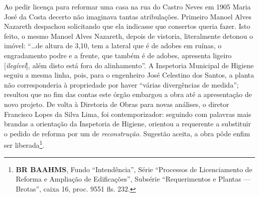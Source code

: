 Ao pedir licença para reformar uma casa na rua do Castro Neves em 1905 Maria José da Costa decerto não imaginava tantas atribulações. Primeiro Manoel Alves Nazareth despachou solicitando que ela indicasse que consertos queria fazer. Isto feito, o mesmo Manoel Alves Nazareth, depois de vistoria, literalmente detonou o imóvel: ``\dots de altura de 3,10, tem a lateral que é de adobes em ruínas, o engradamento podre e a frente, que também é de adobes, apresenta ligeiro [\textit{ilegível}], além disto está fora do alinhamento''. A Inspetoria Municipal de Higiene seguiu a mesma linha, pois, para o engenheiro José Celestino dos Santos, a planta não corresponderia à propriedade por haver ``várias divergências de medida''; resultou que no fim das contas este órgão embargou a obra até a apresentação de novo projeto. De volta à Diretoria de Obras para novas análises, o diretor Francisco Lopes da Silva Lima, foi contemporizador: seguindo com palavras mais brandas a orientação da Inspetoria de Higiene, orientou a requerente a substituir o pedido de reforma por um de \textit{reconstrução}. Sugestão aceita, a obra pôde enfim ser liberada\footnote{\textbf{BR BAAHMS}, Fundo ``Intendência'', Série ``Processos de Licenciamento de Reforma e Ampliação de Edificações'', Subsérie ``Requerimentos e Plantas --- Brotas'', caixa 16, proc. 9551 fls. 232.}.

